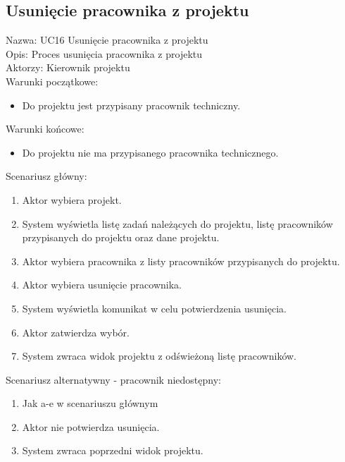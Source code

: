 \subsection{Usunięcie pracownika z projektu}
\begin{adjustwidth}{5em}{0pt}
Nazwa: UC16 Usunięcie pracownika z projektu \\
Opis: Proces usunięcia pracownika z projektu \\
Aktorzy: Kierownik projektu \\
Warunki początkowe:
\begin{itemize}
\item Do projektu jest przypisany pracownik techniczny.
\end{itemize}
Warunki końcowe:
\begin{itemize}
\item Do projektu nie ma przypisanego pracownika technicznego.
\end{itemize}
Scenariusz główny:
\begin{enumerate}
\item Aktor wybiera projekt.
\item System wyświetla listę zadań należących do projektu, listę pracowników przypisanych do projektu oraz dane projektu.
\item Aktor wybiera pracownika z listy pracowników przypisanych do projektu.
\item Aktor wybiera usunięcie pracownika.
\item System wyświetla komunikat w celu potwierdzenia usunięcia.
\item Aktor zatwierdza wybór.
\item System zwraca widok projektu z odświeżoną listę pracowników.
\end{enumerate}
Scenariusz alternatywny - pracownik niedostępny: 
\begin{enumerate}
\item Jak a-e w scenariuszu głównym
\item Aktor nie potwierdza usunięcia.
\item System zwraca poprzedni widok projektu.
\end{enumerate}
\end{adjustwidth}

